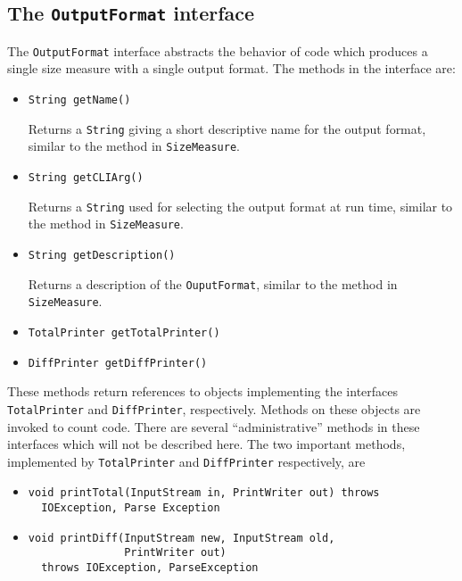 \subsection{The {\tt OutputFormat} interface}

The \mbox{\tt OutputFormat} interface abstracts the behavior of code which
produces a single size measure with a single output format.  The
methods in the interface are:

\begin{itemize}

\item \mbox{\tt String getName()}

Returns a {\tt String} giving a short descriptive name for the output format, similar to the
method in \mbox{\tt SizeMeasure}.

\item \mbox{\tt String getCLIArg()}

Returns a \mbox{\tt String} used for selecting the output format at run time,
similar to the method in \mbox{\tt SizeMeasure}.

\item \mbox{\tt String getDescription()}

Returns a description of the \mbox{\tt OuputFormat}, similar to the method in
\mbox{\tt SizeMeasure}.

\item \mbox{\tt TotalPrinter getTotalPrinter()}
\item \mbox{\tt DiffPrinter getDiffPrinter()}

\end{itemize}

These methods return references to objects implementing the interfaces \mbox{\tt TotalPrinter}
and \mbox{\tt DiffPrinter}, respectively.  Methods on these objects are invoked
to count code.  There are several ``administrative'' methods in these
interfaces which will not be described here.  The two important
methods, implemented by \mbox{\tt TotalPrinter} and \mbox{\tt DiffPrinter} respectively, are

\begin{itemize}

\item
\singlespace
\begin{verbatim}
void printTotal(InputStream in, PrintWriter out) throws
  IOException, Parse Exception
\end{verbatim}
\doublespace 

\item 
\singlespace
\begin{verbatim}
void printDiff(InputStream new, InputStream old, 
               PrintWriter out) 
  throws IOException, ParseException
\end{verbatim}
\doublespace

\end{itemize}

